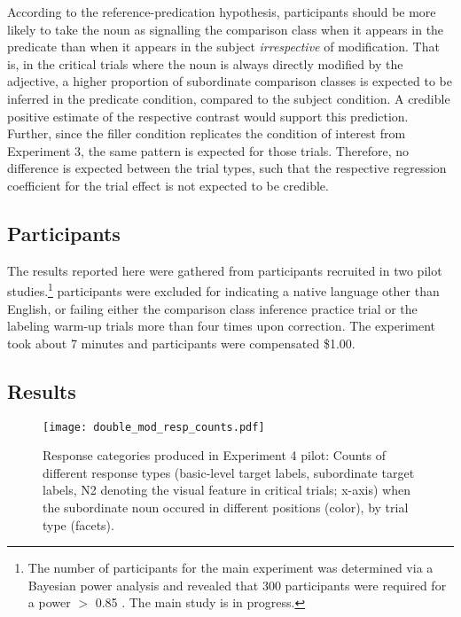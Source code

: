 
According to the reference-predication hypothesis, participants should be more likely to take the noun as signalling the comparison class when it appears in the predicate than when it appears in the subject \emph{irrespective} of modification. That is, in the critical trials where the noun is always directly modified by the adjective, a higher proportion of subordinate comparison classes is expected to be inferred in the predicate condition, compared to the subject condition. A credible positive estimate of the respective contrast would support this prediction. Further, since the filler condition replicates the condition of interest from Experiment 3, the same pattern is expected for those trials. Therefore, no difference is expected between the trial types, such that the respective regression coefficient for the trial effect is not expected to be credible.     

\subsection{Participants}
The results reported here were gathered from  participants recruited in two pilot studies.\footnote{The number of participants for the main experiment was determined via a Bayesian power analysis and revealed that 300 participants were required for a power $>$ 0.85 \parencite{kruschke2014doing, powerKurz}. The main study is in progress.}  participants were excluded for indicating a native language other than English, or failing either the comparison class inference practice trial or the labeling warm-up trials more than four times upon correction. The experiment took about 7 minutes and participants were compensated \$1.00.   
 
\subsection{Results}
\begin{figure*}[t]
	\begin{center}
		\texttt{[image: double\_mod\_resp\_counts.pdf]}
	\end{center}
	\vspace{-0.3cm}
	\caption{Response categories produced in Experiment 4 pilot: Counts of different response types (basic-level target labels, subordinate target labels, N2 denoting the visual feature in critical trials; x-axis) when the subordinate noun occured in different positions (color),  by trial type (facets).}
	\label{double-mod-resp-counts}
\end{figure*}


